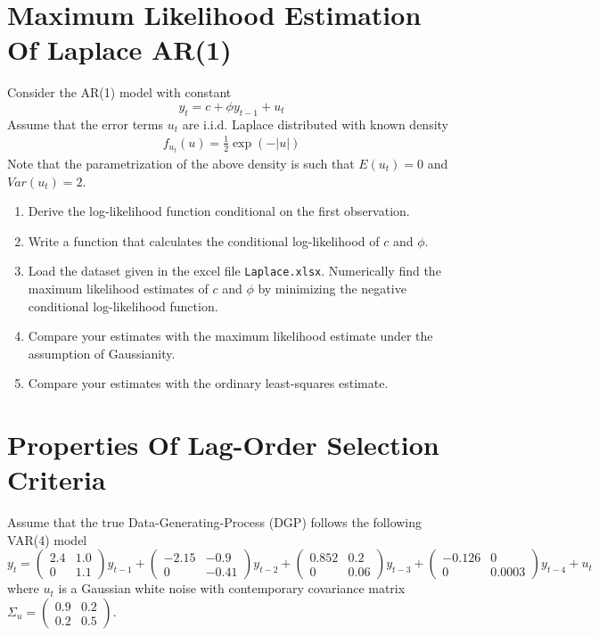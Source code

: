 \documentclass{article}
\begin{document}
\newpage

\section[Maximum Likelihood Estimation Of Laplace AR(1)]{Maximum Likelihood Estimation Of Laplace AR(1)\label{ex:MaximumLikelihoodEstimationLaPlaceARp}}
Consider the AR(1) model with constant
$$ y_t = c + \phi y_{t-1} + u_t$$
Assume that the error terms $u_t$ are i.i.d. Laplace distributed with known density
\begin{align*}
f_{u_{t}}(u)=\frac{1}{2}\exp \left( -|u|\right)
\end{align*}
Note that the parametrization of the above density is such that $E(u_t)=0$ and $Var(u_t)=2$.
\begin{enumerate}
	\item Derive the log-likelihood function conditional on the first observation.
 	\item Write a function that calculates the conditional log-likelihood of $c$ and $\phi$.
 	\item Load the dataset given in the excel file \texttt{Laplace.xlsx}. Numerically find the maximum likelihood estimates of $c$ and $\phi$ by minimizing the negative conditional log-likelihood function.
 	\item Compare your estimates with the maximum likelihood estimate under the assumption of Gaussianity.
 	\item Compare your estimates with the ordinary least-squares estimate.
\end{enumerate}

\newpage

\section{Properties Of Lag-Order Selection Criteria}
Assume that the true Data-Generating-Process (DGP) follows the following VAR(4) model
$$y_t = \begin{pmatrix}
2.4 & 1.0\\
0 & 1.1
\end{pmatrix}
y_{t-1}+
\begin{pmatrix}
-2.15 & -0.9\\
0 & -0.41
\end{pmatrix}
y_{t-2}+
\begin{pmatrix}
0.852 & 0.2\\
0& 0.06
\end{pmatrix}
y_{t-3}+
\begin{pmatrix}
-0.126 & 0\\
0 & 0.0003
\end{pmatrix}
y_{t-4}
+ u_t$$
where $u_t$ is a Gaussian white noise with contemporary covariance matrix $\Sigma_u = \begin{pmatrix}
0.9&0.2\\0.2&0.5
\end{pmatrix}$.
\end{document}
